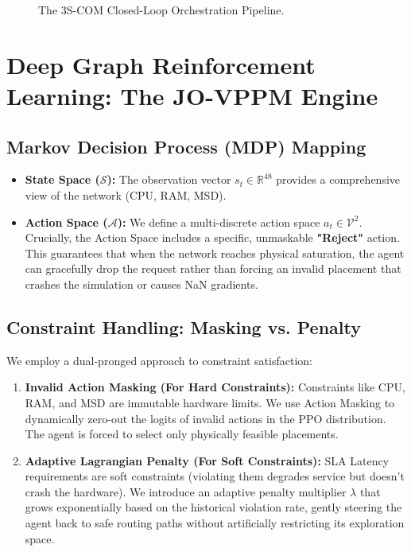 \begin{figure}[H]
    \centering
    \vspace{6cm}
    \caption{The 3S-COM Closed-Loop Orchestration Pipeline.}
    \label{fig:3scom_closed_loop}
\end{figure}


\section{Deep Graph Reinforcement Learning: The JO-VPPM Engine}

\subsection{Markov Decision Process (MDP) Mapping}
\begin{itemize}
    \item \textbf{State Space ($\mathcal{S}$):} The observation vector $s_t \in \mathbb{R}^{48}$ provides a comprehensive view of the network (CPU, RAM, MSD). 
    \item \textbf{Action Space ($\mathcal{A}$):} We define a multi-discrete action space $a_t \in \mathcal{V}^2$. Crucially, the Action Space includes a specific, unmaskable \textbf{"Reject"} action. This guarantees that when the network reaches physical saturation, the agent can gracefully drop the request rather than forcing an invalid placement that crashes the simulation or causes NaN gradients.
\end{itemize}

\subsection{Constraint Handling: Masking vs. Penalty}
We employ a dual-pronged approach to constraint satisfaction:
\begin{enumerate}
    \item \textbf{Invalid Action Masking (For Hard Constraints):} Constraints like CPU, RAM, and MSD are immutable hardware limits. We use Action Masking to dynamically zero-out the logits of invalid actions in the PPO distribution. The agent is forced to select only physically feasible placements.
    \item \textbf{Adaptive Lagrangian Penalty (For Soft Constraints):} SLA Latency requirements are soft constraints (violating them degrades service but doesn't crash the hardware). We introduce an adaptive penalty multiplier $\lambda$ that grows exponentially based on the historical violation rate, gently steering the agent back to safe routing paths without artificially restricting its exploration space.
\end{enumerate}


